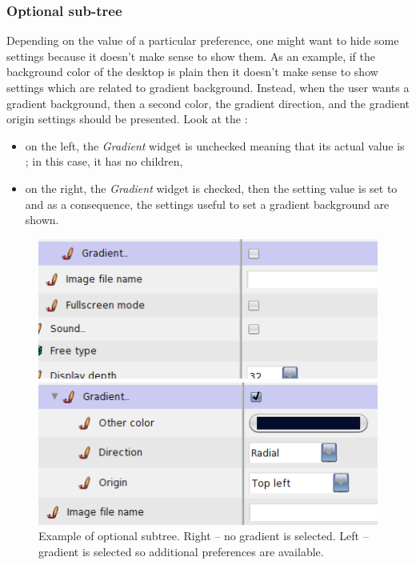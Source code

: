 \documentclass[a4paper,10pt,twoside]{book}
\begin{document}
\subsubsection{Optional sub-tree}
Depending on the value of a particular preference, one might want to hide some settings because it doesn't make sense to show them. As an example, if the background color of the desktop is plain then it doesn't make sense to show settings which are related to gradient background. Instead, when the user wants a gradient background, then a second color, the gradient direction, and the gradient origin settings should be presented. 
Look at the :
\begin{itemize}
\item on the left, the \textit{Gradient} widget is unchecked meaning that its actual value is ; in this case, it has no children, 
\item on the right, the \textit{Gradient} widget is checked, then the setting value is set to  and as a consequence, the settings useful to set a gradient background are shown.
\end{itemize}
\begin{figure}[tbh]
\begin{center}
\begin{minipage}[t]{0.49\linewidth}
\includegraphics[scale=0.35]{smart-subtree1}
\end{minipage}
\begin{minipage}[t]{0.49\linewidth}
\includegraphics[scale=0.35]{smart-subtree2}
\end{minipage}
\caption{Example of optional subtree. Right -- no gradient is selected. Left -- gradient is selected so additional preferences are available.}
\end{center}
\end{figure}
\end{document}
